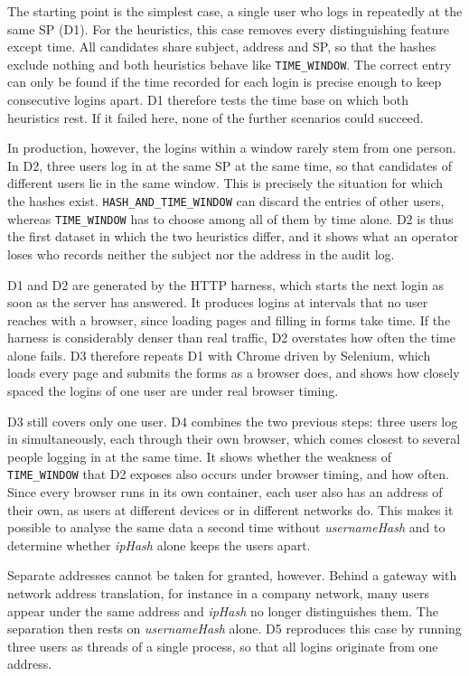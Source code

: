 \documentclass[../main.tex]{subfiles}
\begin{document}
The starting point is the simplest case, a single user who logs in repeatedly at the same SP (D1). 
For the heuristics, this case removes every distinguishing feature except time. 
All candidates share subject, address and SP, so that the hashes exclude nothing and both 
heuristics behave like \texttt{TIME\_\allowbreak{}WINDOW}. 
The correct entry can only be found if the time recorded for each login is precise enough to keep 
consecutive logins apart. 
D1 therefore tests the time base on which both heuristics rest. 
If it failed here, none of the further scenarios could succeed. 

In production, however, the logins within a window rarely stem from one person. 
In D2, three users log in at the same SP at the same time, so that candidates of different users 
lie in the same window. 
This is precisely the situation for which the hashes exist. 
\texttt{HASH\_\allowbreak{}AND\_\allowbreak{}TIME\_\allowbreak{}WINDOW} can discard the entries of 
other users, whereas \texttt{TIME\_\allowbreak{}WINDOW} has to choose among all of them by time 
alone. 
D2 is thus the first dataset in which the two heuristics differ, and it shows what an operator 
loses who records neither the subject nor the address in the audit log. 

D1 and D2 are generated by the HTTP harness, which starts the next login as soon as the server has 
answered. 
It produces logins at intervals that no user reaches with a browser, since loading pages and 
filling in forms take time. 
If the harness is considerably denser than real traffic, D2 overstates how often the time alone 
fails. 
D3 therefore repeats D1 with Chrome driven by Selenium, which loads every page and submits the 
forms as a browser does, and shows how closely spaced the logins of one user are under real 
browser timing. 

D3 still covers only one user. 
D4 combines the two previous steps: three users log in simultaneously, each through their own 
browser, which comes closest to several people logging in at the same time. 
It shows whether the weakness of \texttt{TIME\_\allowbreak{}WINDOW} that D2 exposes also occurs 
under browser timing, and how often. 
Since every browser runs in its own container, each user also has an address of their own, as 
users at different devices or in different networks do. 
This makes it possible to analyse the same data a second time without \textit{usernameHash} and 
to determine whether \textit{ipHash} alone keeps the users apart.

Separate addresses cannot be taken for granted, however. 
Behind a gateway with network address translation, for instance in a company network, many users 
appear under the same address and \textit{ipHash} no longer distinguishes them. 
The separation then rests on \textit{usernameHash} alone. 
D5 reproduces this case by running three users as threads of a single process, so that all logins 
originate from one address. 
\end{document}
